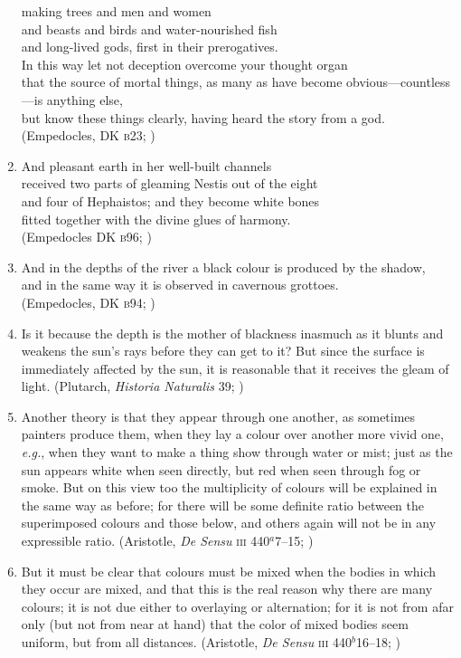 \documentclass[10pt]{article}
\begin{document}
\begin{enumerate}
    making trees and men and women\\
    and beasts and birds and water-nourished fish\\
    and long-lived gods, first in their prerogatives.\\
    In this way let not deception overcome your thought organ\\
    that the source of mortal things, as many as have become obvious---countless---is anything else,\\
    but know these things clearly, having heard the story from a god.\\ 
    (Empedocles, DK \textsc{b}23; \citealt[27 231]{Inwood:2001ve})
    \item And pleasant earth in her well-built channels\\
    received two parts of gleaming Nestis out of the eight\\
    and four of Hephaistos; and they become white bones\\
    fitted together with the divine glues of harmony.\\
    (Empedocles DK \textsc{b}96; \citealt[62 245]{Inwood:2001ve})
    \item And in the depths of the river a black colour is produced by the shadow,\\
    and in the same way it is observed in cavernous grottoes.\\
    (Empedocles, DK \textsc{b}94; \citealt[105 261]{Inwood:2001ve})
    \item Is it because the depth is the mother of blackness inasmuch as it blunts and weakens the sun's rays before they can get to it? But since the surface is immediately affected by the sun, it is reasonable that it receives the gleam of light.  (Plutarch, \emph{Historia Naturalis} 39; \citealt[\textsc{CTXT}-87 137--138]{Inwood:2001ve})
    \item Another theory is that they appear through one another, as sometimes painters produce them, when they lay a colour over another more vivid one, \emph{e.g.}, when they want to make a thing show through water or mist; just as the sun appears white when seen directly, but red when seen through fog or smoke. But on this view too the multiplicity of colours will be explained in the same way as before; for there will be some definite ratio between the superimposed colours and those below, and others again will not be in any expressible ratio. (Aristotle, \emph{De Sensu} \textsc{iii} 440\( ^{a} \)7--15; \citealt[235]{Hett:1936fk})
    \item But it must be clear that colours must be mixed when the bodies in which they occur are mixed, and that this is the real reason why there are many colours; it is not due either to overlaying or alternation; for it is not from afar only (but not from near at hand) that the color of mixed bodies seem uniform, but from all distances. (Aristotle, \emph{De Sensu} \textsc{iii} 440\( ^{b} \)16--18; \citealt[237]{Hett:1936fk})

\end{enumerate}
\end{document}
